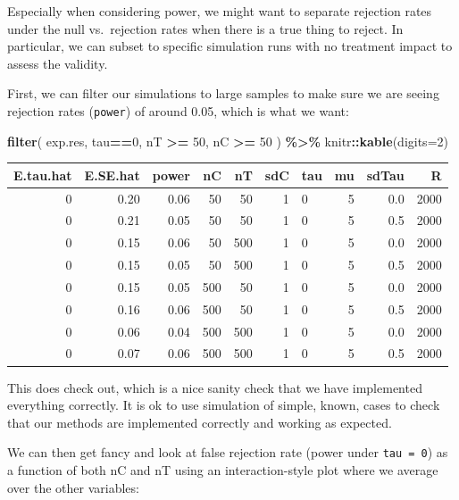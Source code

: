 \documentclass[
]{book}
\newenvironment{Shaded}{\begin{snugshade}}{\end{snugshade}}
\newcommand{\AttributeTok}[1]{\textcolor[rgb]{0.13,0.29,0.53}{#1}}
\newcommand{\DecValTok}[1]{\textcolor[rgb]{0.00,0.00,0.81}{#1}}
\newcommand{\FunctionTok}[1]{\textcolor[rgb]{0.13,0.29,0.53}{\textbf{#1}}}
\newcommand{\NormalTok}[1]{#1}
\newcommand{\SpecialCharTok}[1]{\textcolor[rgb]{0.81,0.36,0.00}{\textbf{#1}}}
\begin{document}
Especially when considering power, we might want to separate rejection rates under the null vs.~rejection rates when there is a true thing to reject.
In particular, we can subset to specific simulation runs with no treatment impact to assess the validity.

First, we can filter our simulations to large samples to make sure we are seeing rejection rates (\texttt{power}) of around 0.05, which is what we want:

\begin{Shaded}
\begin{Highlighting}[]
\FunctionTok{filter}\NormalTok{( exp.res, tau}\SpecialCharTok{==}\DecValTok{0}\NormalTok{, nT }\SpecialCharTok{\textgreater{}=} \DecValTok{50}\NormalTok{, nC }\SpecialCharTok{\textgreater{}=} \DecValTok{50}\NormalTok{ ) }\SpecialCharTok{\%\textgreater{}\%}
\NormalTok{  knitr}\SpecialCharTok{::}\FunctionTok{kable}\NormalTok{(}\AttributeTok{digits=}\DecValTok{2}\NormalTok{)}
\end{Highlighting}
\end{Shaded}

\begin{tabular}{r|r|r|r|r|r|l|r|r|r}
\hline
E.tau.hat & E.SE.hat & power & nC & nT & sdC & tau & mu & sdTau & R\\
\hline
0 & 0.20 & 0.06 & 50 & 50 & 1 & 0 & 5 & 0.0 & 2000\\
\hline
0 & 0.21 & 0.05 & 50 & 50 & 1 & 0 & 5 & 0.5 & 2000\\
\hline
0 & 0.15 & 0.06 & 50 & 500 & 1 & 0 & 5 & 0.0 & 2000\\
\hline
0 & 0.15 & 0.05 & 50 & 500 & 1 & 0 & 5 & 0.5 & 2000\\
\hline
0 & 0.15 & 0.05 & 500 & 50 & 1 & 0 & 5 & 0.0 & 2000\\
\hline
0 & 0.16 & 0.06 & 500 & 50 & 1 & 0 & 5 & 0.5 & 2000\\
\hline
0 & 0.06 & 0.04 & 500 & 500 & 1 & 0 & 5 & 0.0 & 2000\\
\hline
0 & 0.07 & 0.06 & 500 & 500 & 1 & 0 & 5 & 0.5 & 2000\\
\hline
\end{tabular}

This does check out, which is a nice sanity check that we have implemented everything correctly.
It is ok to use simulation of simple, known, cases to check that our methods are implemented correctly and working as expected.

We can then get fancy and look at false rejection rate (power under \texttt{tau\ =\ 0}) as a
function of both nC and nT using an interaction-style plot where we average over the other variables:
\end{document}

